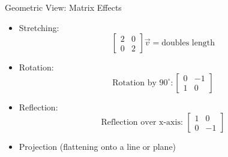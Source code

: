 \documentclass{beamer}
\begin{document}
\begin{frame}{Geometric View: Matrix Effects}
  \begin{itemize}
    \item Stretching: 
    \begin{equation}
    \begin{bmatrix} 2 & 0 \\ 0 & 2 \end{bmatrix} \vec{v} = \text{doubles length}
    \end{equation}
    \item Rotation:
    \begin{equation}
    \text{Rotation by } 90^\circ: \begin{bmatrix} 0 & -1 \\ 1 & 0 \end{bmatrix}
    \end{equation}
    \item Reflection:
    \begin{equation}
    \text{Reflection over x-axis: } \begin{bmatrix} 1 & 0 \\ 0 & -1 \end{bmatrix}
    \end{equation}
    \item Projection (flattening onto a line or plane)
  \end{itemize}
\end{frame}
\end{document}
